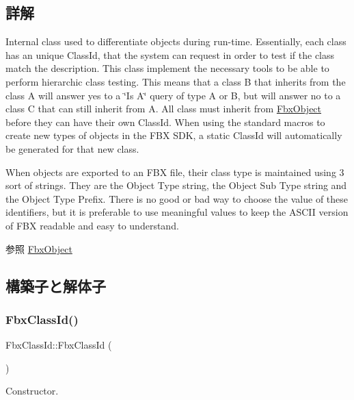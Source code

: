 \subsection{詳解}
Internal class used to differentiate objects during run-\/time. Essentially, each class has an unique Class\+Id, that the system can request in order to test if the class match the description. This class implement the necessary tools to be able to perform hierarchic class testing. This means that a class B that inherits from the class A will answer yes to a \char`\"{}\+Is A\char`\"{} query of type A or B, but will answer no to a class C that can still inherit from A. All class must inherit from \hyperlink{class_fbx_object}{Fbx\+Object} before they can have their own Class\+Id. When using the standard macros to create new types of objects in the F\+BX S\+DK, a static Class\+Id will automatically be generated for that new class.

When objects are exported to an F\+BX file, their class type is maintained using 3 sort of strings. They are the Object Type string, the Object Sub Type string and the Object Type Prefix. There is no good or bad way to choose the value of these identifiers, but it is preferable to use meaningful values to keep the A\+S\+C\+II version of F\+BX readable and easy to understand. \begin{DoxySeeAlso}{参照}
\hyperlink{class_fbx_object}{Fbx\+Object} 
\end{DoxySeeAlso}


\subsection{構築子と解体子}
\mbox{\label{class_fbx_class_id_afb4ee8374e852a1ea03c6c057ce15da8}} 
\subsubsection{\texorpdfstring{Fbx\+Class\+Id()}{FbxClassId()}\hspace{0.1cm}{\footnotesize\ttfamily [1/2]}}
{\footnotesize\ttfamily Fbx\+Class\+Id\+::\+Fbx\+Class\+Id (\begin{DoxyParamCaption}{ }\end{DoxyParamCaption})}



Constructor. 

